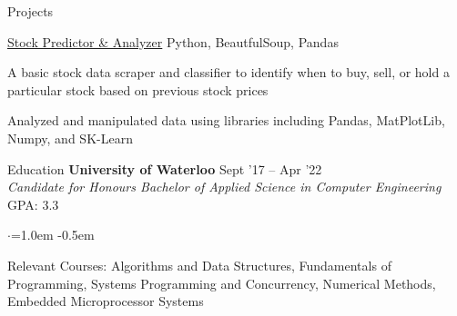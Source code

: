 \documentclass{resume} %
\newcommand{\ExternalLink}{%
    \tikz[x=1.2ex, y=1.2ex, baseline=-0.05ex]{%
        \begin{scope}[x=1ex, y=1ex]
            \clip (-0.1,-0.1) 
                --++ (-0, 1.2) 
                --++ (0.6, 0) 
                --++ (0, -0.6) 
                --++ (0.6, 0) 
                --++ (0, -1);
            \path[draw, 
                line width = 0.5, 
                rounded corners=0.5] 
                (0,0) rectangle (1,1);
        \end{scope}
        \path[draw, line width = 0.5] (0.5, 0.5) 
            -- (1, 1);
        \path[draw, line width = 0.5] (0.6, 1) 
            -- (1, 1) -- (1, 0.6);
        }
    }
\begin{document}
\begin{rSection}{Projects}

  \begin{rWorkSection}{\href{https://github.com/tharseken/Stock-Predictor-and-Analyzer}{Stock Predictor \& Analyzer}}
                      {}
                      {Python, BeautfulSoup, Pandas}
                      {}
    \item A basic stock data scraper and classifier to identify when to buy, sell, or hold a particular stock based on previous stock prices
    \item Analyzed and manipulated data using libraries including Pandas, MatPlotLib, Numpy, and SK-Learn
  
  \end{rWorkSection}
  
  \vspace{-0.1em}

  \end{rSection}


\begin{rSection}{Education}
  {\bf University of Waterloo} \hfill {Sept '17 -- Apr '22}\\
  {\em Candidate for Honours Bachelor of Applied Science in Computer Engineering} \hfill {GPA: 3.3}\\
\end{rSection}
\vspace{-1.25em}
\begin{list}{$\cdot$}{\leftmargin=1.0em}
  \itemsep -0.5em \vspace{-0.5em}
  \item Relevant Courses: Algorithms and Data Structures, Fundamentals of Programming, Systems Programming and Concurrency, Numerical Methods, Embedded Microprocessor Systems
\end{list}
\end{document}
